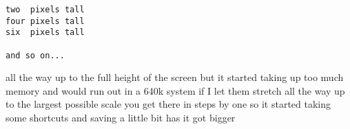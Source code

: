 \documentclass[book.tex]{subfiles}
\begin{document}
\par
\begin{lstlisting}[breaklines=true,breakindent=0em]
two  pixels tall 
four pixels tall 
six  pixels tall

and so on...
\end{lstlisting}

all the way up to the full height of the screen but it started taking 
up too much memory and would run out in a 640k system if I let them 
stretch all the way up to the largest possible scale you get there in 
steps by one so it started taking some shortcuts and saving a little 
bit has it got bigger\\
   
\end{document}
